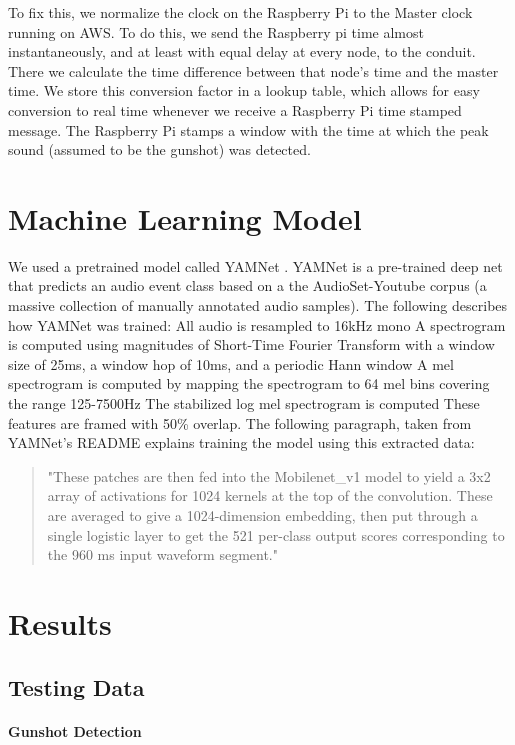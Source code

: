 \documentclass[conference]{IEEEtran}
\begin{document}
To fix this, we normalize the clock on the Raspberry Pi to the Master clock running on AWS. To do this, we send the Raspberry pi time almost instantaneously, and at least with equal delay at every node, to the conduit. There we calculate the time difference between that node’s time and the master time. We store this conversion factor in a lookup table, which allows for easy conversion to real time whenever we receive a Raspberry Pi time stamped message. The Raspberry Pi stamps a window with the time at which the peak sound (assumed to be the gunshot) was detected.

\section{Machine Learning Model}
We used a pretrained model called YAMNet  \cite{b6}. YAMNet is a pre-trained deep net that predicts an audio event class based on a the AudioSet-Youtube corpus (a massive collection of manually annotated audio samples). The following describes how YAMNet was trained: 
    All audio is resampled to 16kHz mono
    A spectrogram is computed using magnitudes of Short-Time Fourier Transform with a window size of 25ms, a window hop of 10ms, and a periodic Hann window
    A mel spectrogram is computed by mapping the spectrogram to 64 mel bins covering the range 125-7500Hz
    The stabilized log mel spectrogram is computed 
    These features are framed with 50\% overlap. 
The following paragraph, taken from YAMNet’s README explains training the model using this extracted data:
\begin{quote}
"These patches are then fed into the Mobilenet\_v1 model to yield a 3x2 array of activations for 1024 kernels at the top of the convolution. These are averaged to give a 1024-dimension embedding, then put through a single logistic layer to get the 521 per-class output scores corresponding to the 960 ms input waveform segment."
\end{quote}


\section{Results}

\subsection{Testing Data}

\paragraph{Gunshot Detection}
\end{document}
